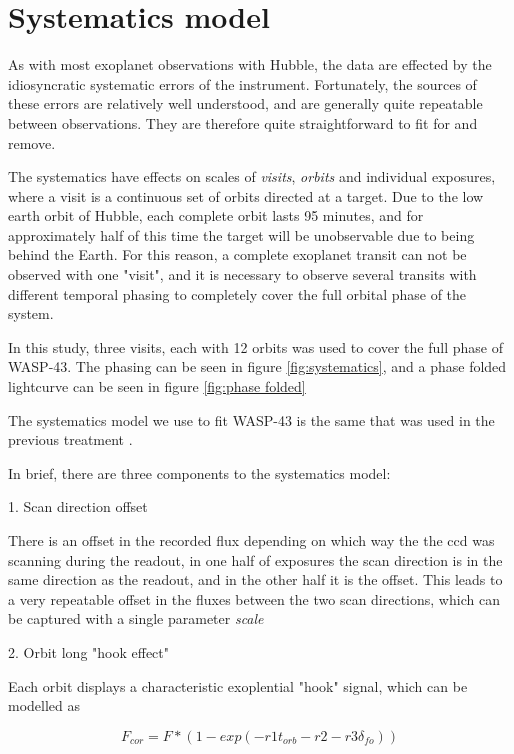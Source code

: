 \documentclass[a4paper,fleqn,usenatbib]{mnras}
\begin{document}
\section{Systematics model}\label{sec:systematics}

As with most exoplanet observations with Hubble, the data are effected by the idiosyncratic systematic errors of the instrument. Fortunately, the sources of these errors are relatively well understood, and are generally quite repeatable between observations. They are therefore quite straightforward to fit for and remove. 

The systematics have effects on scales of \emph{visits}, \emph{orbits} and individual exposures, where a visit is a continuous set of orbits directed at a target. Due to the low earth orbit of Hubble, each complete orbit lasts 95 minutes, and for approximately half of this time the target will be unobservable due to being behind the Earth. For this reason, a complete exoplanet transit can not be observed with one "visit", and it is necessary to observe several transits with different temporal phasing to completely cover the full orbital phase of the system.

In this study, three visits, each with 12 orbits was used to cover the full phase of WASP-43. The phasing can be seen in figure \ref{fig:systematics}, and a phase folded lightcurve can be seen in figure \ref{fig:phase folded}

The systematics model we use to fit WASP-43 is the same that was used in the previous treatment \citep{Stevenson2014}.

In brief, there are three components to the systematics model:

1. Scan direction offset

There is an offset in the recorded flux depending on which way the the ccd was scanning during the readout, in one half of exposures the scan direction is in the same direction as the readout, and in the other half it is the offset. This leads to a very repeatable offset in the fluxes between the two scan directions, which can be captured with a single parameter \emph{scale}

2. Orbit long "hook effect"

Each orbit displays a characteristic exoplential "hook" signal, which can be modelled as

\begin{equation} \label{eq:hook}
F_{cor} = F*(1-exp(-r1 t_{orb}-r2-r3 \delta_{fo}))
\end{equation}
\end{document}
